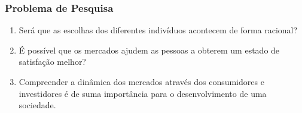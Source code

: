 \documentclass{beamer}
\begin{document}
\begin{frame}
  \frametitle{Problema de Pesquisa}
  \begin{enumerate}
    \justifying
    \setlength\itemsep{0.5cm}
    \item Será que as escolhas dos diferentes indivíduos acontecem de forma racional?
    \item É possível que os mercados ajudem as pessoas a obterem um estado de satisfação melhor?
    \item Compreender a dinâmica dos mercados através dos consumidores e investidores é de suma importância para o desenvolvimento de uma sociedade. 
  \end{enumerate}
\end{frame}
\end{document}
